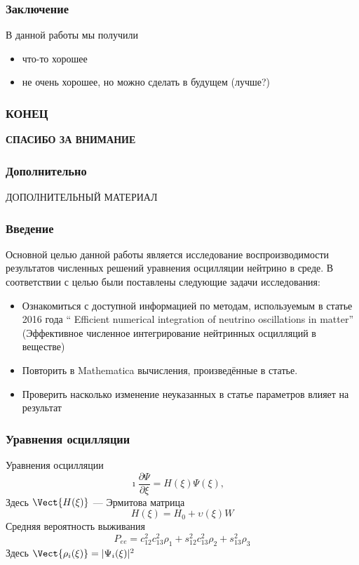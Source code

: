 \documentclass[utf8,9pt,mathserif,usepdftitle=false]{beamer}
\begin{document}
\begin{frame}
  \frametitle{Заключение}%
  В данной работы мы получили
  \begin{itemize}
  \item<1-> что-то хорошее
  \item<2-> не очень хорошее, но можно сделать в будущем (лучше?)
  \end{itemize}
\end{frame}

\begin{frame}
  \frametitle{КОНЕЦ}%
  \LARGE%
  \centering%
  \bfseries%
  СПАСИБО ЗА ВНИМАНИЕ%
\end{frame}

\begin{frame}
  \frametitle{Дополнительно}%
  \centering%
  ДОПОЛНИТЕЛЬНЫЙ МАТЕРИАЛ
\end{frame}

\begin{frame}
  \frametitle{Введение}%
  Основной целью данной работы является исследование воспроизводимости
  результатов численных решений уравнения осцилляции нейтрино в среде. В
  соответствии с целью были поставлены следующие задачи исследования:
  \begin{itemize}
  \item<1->Ознакомиться с доступной информацией по методам, используемым в
    статье 2016 года “ Efficient numerical integration of neutrino oscillations
    in matter” (Эффективное численное интегрирование нейтринных осцилляций в
    веществе)
  \item<2-> Повторить в Mathematica вычисления, произведённые в статье.
  \item<3->Проверить насколько изменение неуказанных в статье параметров влияет
    на результат
  \end{itemize}
\end{frame}

\begin{frame}
  \frametitle{Уравнения осцилляции}%
 Уравнения осцилляции
  \begin{equation*}
    \imath \frac{\partial \Psi}{\partial \xi}=H(\xi)\Psi(\xi),\quad
  \end{equation*}
   Здесь \(\Vect{H(\xi)}\) — Эрмитова матрица
  \begin{equation*}
    H(\xi)=H_0+\upsilon(\xi)W
  \end{equation*}
  Средняя вероятность выживания
  \begin{equation*}
    P_{ee}=c_{12}^2c_{13}^2\rho_1+ s_{12}^2c_{13}^2\rho_2 + s_{13}^2\rho_3
  \end{equation*}
 Здесь \(\Vect{\rho_i(\xi)}=|\Psi_i(\xi)|^2\)
\end{frame}
\end{document}
